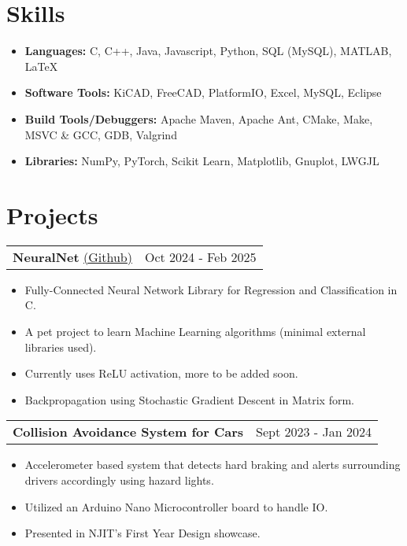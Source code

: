 \documentclass{article}
\begin{document}
\section{Skills} \vspace{4pt}
    \begin{itemize}
        \setlength{\itemsep}{-2pt}
        \item {\bf Languages:} C, C++, Java, Javascript, Python, SQL (MySQL), MATLAB, \LaTeX
        \item {\bf Software Tools:} KiCAD, FreeCAD, PlatformIO, Excel, MySQL, Eclipse
        \item {\bf Build Tools/Debuggers:} Apache Maven, Apache Ant, CMake, Make, MSVC \& GCC, GDB, Valgrind
        \item {\bf Libraries:} NumPy, PyTorch, Scikit Learn, Matplotlib, Gnuplot, LWGJL
    \end{itemize}

\section{Projects}
    \raggedright\begin{tabular}{lr}
        \parbox[l]{3.65in}{{\bf{\large{NeuralNet}}} \href{https://github.com/avr34/NeuralNet}{(\underline{Github})}} &
        \parbox[r]{3.65in}{\raggedleft Oct 2024 - Feb 2025} \\
    \end{tabular}
    \begin{itemize} \vspace{-5pt}
        \setlength{\itemsep}{-2pt}
        \item Fully-Connected Neural Network Library for Regression and Classification in C.
        \item A pet project to learn Machine Learning algorithms (minimal external libraries used).
        \item Currently uses ReLU activation, more to be added soon.
        \item Backpropagation using Stochastic Gradient Descent in Matrix form.
    \end{itemize}

    \raggedright\begin{tabular}{lr}
        \parbox[l]{3.65in}{\bf{\large{Collision Avoidance System for Cars}}} &
        \parbox[r]{3.65in}{\raggedleft Sept 2023 - Jan 2024} \\
    \end{tabular}
    \begin{itemize} \vspace{-5pt}
        \setlength{\itemsep}{-2pt}
        \item Accelerometer based system that detects hard braking and alerts surrounding drivers accordingly using hazard lights.
        \item Utilized an Arduino Nano Microcontroller board to handle IO.
        \item Presented in NJIT's First Year Design showcase.
    \end{itemize}
    
\end{document}
